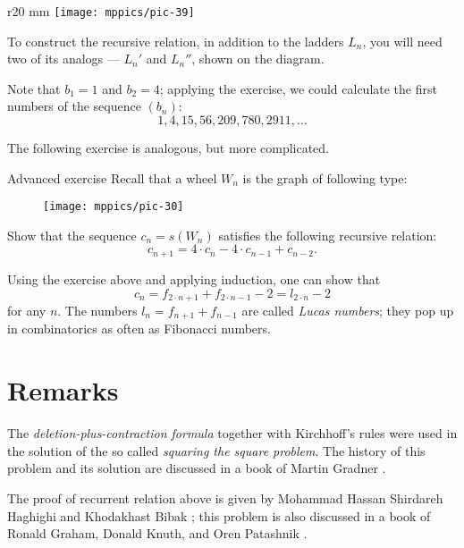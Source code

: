 \begin{wrapfigure}{r}{20 mm}
\vskip-12mm
\centering
\texttt{[image: mppics/pic-39]}
\end{wrapfigure}

 To construct the recursive relation, in addition to the ladders $L_n$, you will need two of its analogs --- $L_n'$ and $L_n''$, shown on the diagram.

\medskip

Note that $b_1=1$ and $b_2=4$; applying the exercise, we could calculate the first numbers of the sequence $(b_n)$:
\[1,4,15,56,209,780,2911,\dots \]

The following exercise is analogous, but more complicated.

\begin{thm}{Advanced exercise}
Recall that a wheel $W_n$ is the graph of following type:

\begin{figure}[h!]
\centering
\texttt{[image: mppics/pic-30]}
\end{figure}

Show that the sequence $c_n=s(W_n)$ satisfies the following recursive relation:
\[c_{n+1}=4\cdot c_n-4\cdot c_{n-1}+c_{n-2}.\]

\end{thm}

Using the exercise above and applying induction, one can show that 
\[c_n=f_{2\cdot n+1}+f_{2\cdot n-1}-2=l_{2\cdot  n}-2\]
for any $n$.
The numbers $l_n=f_{n+1}+f_{n-1}$ are called \emph{Lucas numbers};
they pop up in combinatorics as often as Fibonacci numbers.  

\section*{Remarks}

The \emph{deletion-plus-contraction formula} together with Kirchhoff's rules were used in the solution of the so called \emph{squaring the square problem}.
The history of this problem and its solution are discussed in a book of Martin Gradner \cite[Chapter 17]{gardiner}.

The proof of recurrent relation above is given by Mohammad Hassan Shirdareh Haghighi and Khodakhast Bibak \cite[see][]{haghighi-bibak};
this problem is also discussed in a book of  Ronald Graham, Donald Knuth, and Oren Patashnik \cite[see][]{knut}.
